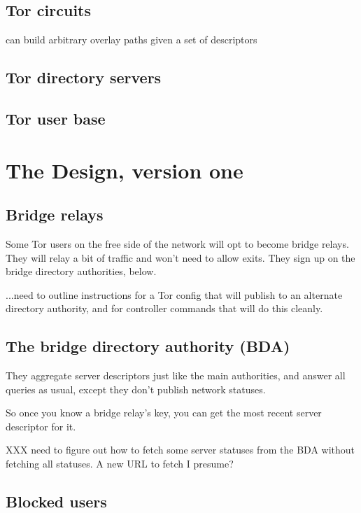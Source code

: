 \documentclass{llncs}
\begin{document}
\subsection{Tor circuits}

can build arbitrary overlay paths given a set of descriptors~\cite{blossom}

\subsection{Tor directory servers}

\subsection{Tor user base}

\section{The Design, version one}

\subsection{Bridge relays}

Some Tor users on the free side of the network will opt to become
bridge relays. They will relay a bit of traffic and won't need to allow
exits. They sign up on the bridge directory authorities, below.

...need to outline instructions for a Tor config that will publish
to an alternate directory authority, and for controller commands
that will do this cleanly.

\subsection{The bridge directory authority (BDA)}

They aggregate server descriptors just like the main authorities, and
answer all queries as usual, except they don't publish network statuses.

So once you know a bridge relay's key, you can get the most recent
server descriptor for it.

XXX need to figure out how to fetch some server statuses from the BDA
without fetching all statuses. A new URL to fetch I presume?

\subsection{Blocked users}
\end{document}
